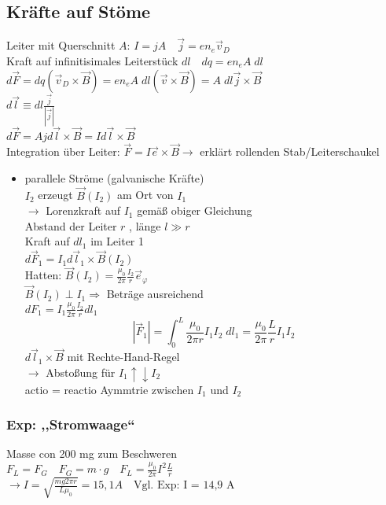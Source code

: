 \documentclass[titlepage,12pt,a4paper,ngerman]{report}
\newcommand{\tx}[1]{\textrm{#1}}
\begin{document}
\subsection{Kräfte auf Stöme}
Leiter mit Querschnitt $ A $: $ I = j A \quad \vec{j} = e n_e \vec{v}_D $\\
Kraft auf infinitisimales Leiterstück $ dl \quad dq = e n_e A \; dl $\\
$ d\vec{F} = dq (\vec{v}_D \times \vec{B}) = e n_e A\; dl (\vec{v} \times \vec{B}) = A \; dl \vec{j} \times \vec{B} $\\
$ d\vec{l} \equiv dl \frac{\vec{j}}{| \vec{j} |}$\\
$ d\vec{F} = A j d\vec{l} \times \vec{B} = I d\vec{l} \times \vec{B} $\\
Integration über Leiter: $ \vec{F} = I \vec{e} \times \vec{B} \rightarrow $ erklärt rollenden Stab/Leiterschaukel\\
\begin{itemize}
	\item parallele Ströme (galvanische Kräfte)\\
	$ I_2 $ erzeugt $ \vec{B} (I_2) $ am Ort von $ I_1 $\\
	$ \rightarrow $ Lorenzkraft auf $ I_1 $ gemäß obiger Gleichung\\
	Abstand der Leiter $ r $ , länge $ l \gg r $\\
	Kraft auf $  dl_1 $ im Leiter 1\\
	$ d\vec{F}_1  = I_1 d\vec{l}_1 \times \vec{B}(I_2) $\\
	Hatten: $ \vec{B}(I_2) = \frac{\mu_0}{2 \pi} \frac{I_2}{r} \vec{e}_\varphi $\\
	$ \vec{B} (I_2) \perp I_1 \Rightarrow $ Beträge ausreichend\\
	$ dF_1 = I_1 \frac{ \mu_0}{2 \pi} \frac{I_2}{r} dl_1 $\\
	$$\boxed{ |\vec{F}_1 | = \int_0 ^L \frac{\mu _0}{2 \pi r } I_1 I_2 \; dl_1 = \frac{\mu_0}{2 \pi} \frac{L}{r} I_1 I_2}$$
	$ d\vec{l}_1 \times \vec{B} $ mit Rechte-Hand-Regel\\
	$ \rightarrow $ Abstoßung für $ I_1 \uparrow \downarrow I_2 $\\
	actio = reactio Aymmtrie zwischen $ I_1 $ und $ I_2 $ \\
\end{itemize}
\subsubsection{Exp: ,,Stromwaage``} 
Masse con 200 mg zum Beschweren\\
$ F_L = F_G \quad F_G = m \cdot g \quad F_L = \frac{\mu_0}{2 \pi} I^2 \frac{L}{r} $\\
$ \rightarrow I = \sqrt{\frac{mg 2 \pi r}{L \mu_0}}  = 15,1 A  \quad \tx{Vgl. Exp: I = 14,9 A }$
\end{document}
